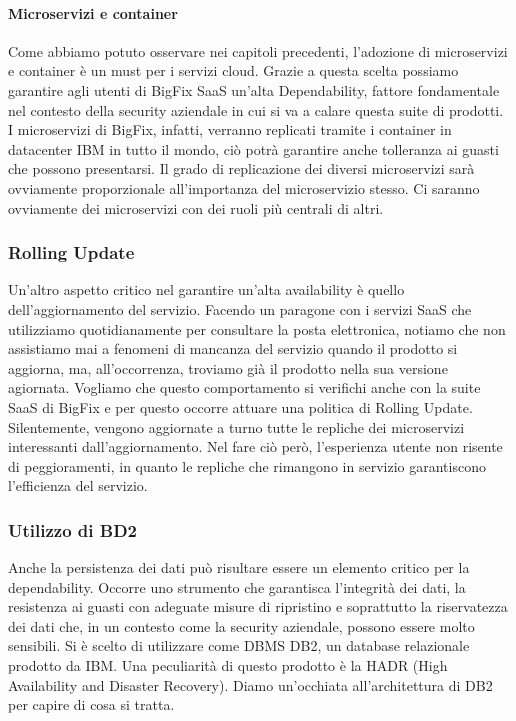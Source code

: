 \paragraph{Microservizi e container}
Come abbiamo potuto osservare nei capitoli precedenti, l'adozione di microservizi e container è un must per i servizi cloud. Grazie a questa scelta possiamo garantire agli utenti di BigFix SaaS un'alta Dependability, fattore fondamentale nel contesto della security aziendale in cui si va a calare questa suite di prodotti. I microservizi di BigFix, infatti, verranno replicati tramite i container in datacenter IBM in tutto il mondo, ciò potrà garantire anche tolleranza ai guasti che possono presentarsi. Il grado di replicazione dei diversi microservizi sarà ovviamente proporzionale all'importanza del microservizio stesso. Ci saranno ovviamente dei microservizi con dei ruoli più centrali di altri.

\subsubsection{Rolling Update}
Un'altro aspetto critico nel garantire un'alta availability è quello dell'aggiornamento del servizio. Facendo un paragone con i servizi SaaS che utilizziamo quotidianamente per consultare la posta elettronica, notiamo che non assistiamo mai a fenomeni di mancanza del servizio quando il prodotto si aggiorna, ma, all'occorrenza, troviamo già il prodotto nella sua versione agiornata. Vogliamo che questo comportamento si verifichi anche con la suite SaaS di BigFix e per questo occorre attuare una politica di Rolling Update. Silentemente, vengono aggiornate a turno tutte le repliche dei microservizi interessanti dall'aggiornamento. Nel fare ciò però, l'esperienza utente non risente di peggioramenti, in quanto le repliche che rimangono in servizio garantiscono l'efficienza del servizio.

\subsubsection{Utilizzo di BD2}
Anche la persistenza dei dati può risultare essere un elemento critico per la dependability. Occorre uno strumento che garantisca l'integrità dei dati, la resistenza ai guasti con adeguate misure di ripristino e soprattutto la riservatezza dei dati che, in un contesto come la security aziendale, possono essere molto sensibili. Si è scelto di utilizzare come DBMS DB2, un database relazionale prodotto da IBM. Una peculiarità di questo prodotto è la HADR (High Availability and Disaster Recovery). Diamo un'occhiata all'architettura di DB2 per capire di cosa si tratta.

